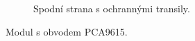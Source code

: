 \begin{figure}[H]
\begin{subfigure}{.5\textwidth}
    \caption{Spodní strana s ochrannými transily.}
    \label{fig:modul-pca9615-transily}
\end{subfigure}
\caption{Modul s obvodem PCA9615.}
\label{fig:modul-pca9615}
\end{figure}